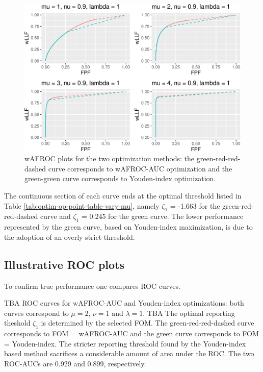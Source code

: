 \documentclass[
]{book}
\begin{document}
\begin{figure}
\centering
\includegraphics{21-optim-op-point_files/figure-latex/optim-op-point-vary-mu-wafroc-1.pdf}
\caption{\label{fig:optim-op-point-vary-mu-wafroc}wAFROC plots for the two optimization methods: the green-red-red-dashed curve corresponds to wAFROC-AUC optimization and the green-green curve corresponds to Youden-index optimization.}
\end{figure}

The continuous section of each curve ends at the optimal threshold listed in Table \ref{tab:optim-op-point-table-vary-mu}, namely \(\zeta_1\) = -1.663 for the green-red-red-dashed curve and \(\zeta_1\) = 0.245 for the green curve. The lower performance represented by the green curve, based on Youden-index maximization, is due to the adoption of an overly strict threshold.

\hypertarget{illustrative-roc-plots-1}{%
\subsection{Illustrative ROC plots}\label{illustrative-roc-plots-1}}

To confirm true performance one compares ROC curves.

TBA ROC curves for wAFROC-AUC and Youden-index optimizations: both curves correspond to \(\mu = 2\), \(\nu = 1\) and \(\lambda = 1\). TBA The optimal reporting theshold \(\zeta_1\) is determined by the selected FOM. The green-red-red-dashed curve corresponds to FOM = wAFROC-AUC and the green curve corresponds to FOM = Youden-index. The stricter reporting threshold found by the Youden-index based method sacrifices a considerable amount of area under the ROC. The two ROC-AUCs are 0.929 and 0.899, respectively.
\end{document}
